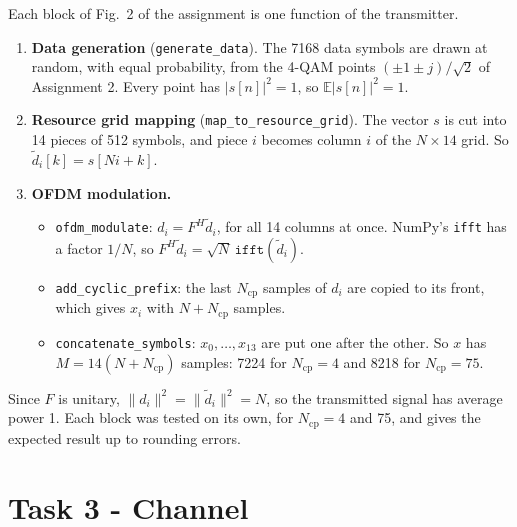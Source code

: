 \documentclass[11pt,a4paper]{article}
\newcommand{\Ncp}{N_{\mathrm{cp}}}
\newcommand{\E}{\mathbb{E}}
\newcommand{\dt}{\tilde{d}}
\begin{document}
Each block of Fig.~2 of the assignment is one function of the transmitter.
\begin{enumerate}[label=(\alph*)]
  \item \textbf{Data generation} (\texttt{generate\_data}). The 7168 data symbols are drawn at random,
        with equal probability, from the 4-QAM points $(\pm 1 \pm j)/\sqrt{2}$ of Assignment 2. Every
        point has $|s[n]|^2 = 1$, so $\E|s[n]|^2 = 1$.
  \item \textbf{Resource grid mapping} (\texttt{map\_to\_resource\_grid}). The vector $s$ is cut into
        14 pieces of 512 symbols, and piece $i$ becomes column $i$ of the $N \times 14$ grid. So
        $\dt_i[k] = s[Ni + k]$.
  \item \textbf{OFDM modulation.}
        \begin{itemize}
          \item \texttt{ofdm\_modulate}: $d_i = F^H \dt_i$, for all 14 columns at once. NumPy's
                \texttt{ifft} has a factor $1/N$, so $F^H \dt_i = \sqrt{N}\,\texttt{ifft}(\dt_i)$.
          \item \texttt{add\_cyclic\_prefix}: the last $\Ncp$ samples of $d_i$ are copied to its front,
                which gives $x_i$ with $N + \Ncp$ samples.
          \item \texttt{concatenate\_symbols}: $x_0, \ldots, x_{13}$ are put one after the other. So $x$ has
                $M = 14(N + \Ncp)$ samples: 7224 for $\Ncp = 4$ and 8218 for $\Ncp = 75$.
        \end{itemize}
\end{enumerate}
Since $F$ is unitary, $\|d_i\|^2 = \|\dt_i\|^2 = N$, so the transmitted signal has average power 1.
Each block was tested on its own, for $\Ncp = 4$ and 75, and gives the expected result up to rounding errors.

\section{Task 3 - Channel}
\end{document}
